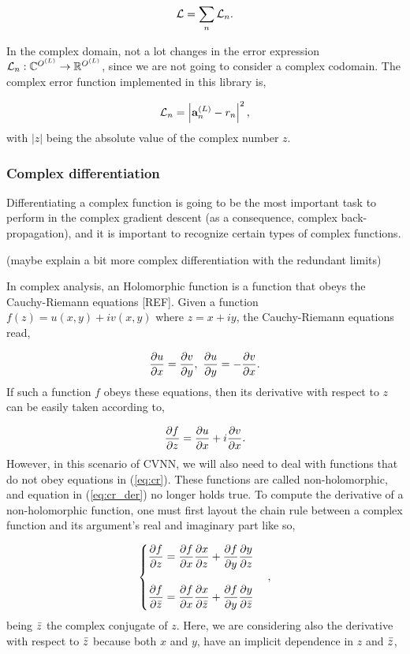 \begin{equation}
	\mathcal{L} = \sum_{n} \mathcal{L}_n.
\end{equation}

In the complex domain, not a lot changes in the error expression $ \mathcal{L}_n: \mathbb{C}^{O^{(L)}} \rightarrow \mathbb{R}^{O^{(L)}} $, since we are not going to consider a complex codomain. The complex error function implemented in this library is,

\begin{equation}
	\mathcal{L}_n = \left| \mathbf{a}^{(L)}_{n} - r_n \right|^2,
	\label{eq:cerror}
\end{equation}
with $ \left| z \right| $ being the absolute value of the complex number $ z $.

\subsubsection{Complex differentiation}
Differentiating a complex function is going to be the most important task to perform in the complex gradient descent (as a consequence, complex back-propagation), and it is important to recognize certain types of complex functions.

(maybe explain a bit more complex differentiation with the redundant limits)

In complex analysis, an Holomorphic function is a function that obeys the Cauchy-Riemann equations [REF]. Given a function $ f(z) = u(x,y) + iv(x,y) $ where $ z = x + iy $, the Cauchy-Riemann equations read,

\begin{equation}
	\dfrac{\partial u}{\partial x} = \dfrac{\partial v}{\partial y}, \ \dfrac{\partial u}{\partial y} = -\dfrac{\partial v}{\partial x}.
	\label{eq:cr}
\end{equation}
If such a function $ f $ obeys these equations, then its derivative with respect to $ z $ can be easily taken according to,

\begin{equation}
	\dfrac{\partial f}{\partial z} = \dfrac{\partial u}{\partial x} + i\dfrac{\partial v}{\partial x}.
	\label{eq:cr_der}
\end{equation}
However, in this scenario of \gls{CVNN}, we will also need to deal with functions that do not obey equations in (\ref{eq:cr}). These functions are called non-holomorphic, and equation in (\ref{eq:cr_der}) no longer holds true. To compute the derivative of a non-holomorphic function, one must first layout the chain rule between a complex function and its argument's real and imaginary part like so,

\begin{equation}
	\begin{cases}
		\dfrac{\partial f}{\partial z} = \dfrac{\partial f}{\partial x}\dfrac{\partial x}{\partial z} + \dfrac{\partial f}{\partial y}\dfrac{\partial y}{\partial z} \\
		\\
		\dfrac{\partial f}{\partial \bar{z}} = \dfrac{\partial f}{\partial x}\dfrac{\partial x}{\partial \bar{z}} + \dfrac{\partial f}{\partial y}\dfrac{\partial y}{\partial \bar{z}}
	\end{cases},
	\label{eq:complex_chain_der}
\end{equation}
being $ \bar{z} $ the complex conjugate of $ z $. Here, we are considering also the derivative with respect to $ \bar{z} $ because both $ x $ and $ y $, have an implicit dependence in $ z $ and $ \bar{z} $,

